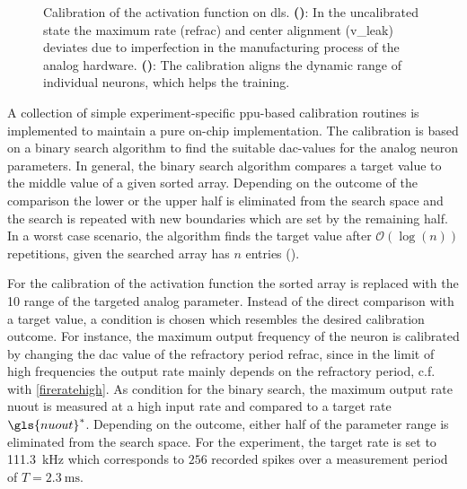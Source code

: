 \begin{figure}
	\centering
	\begin{subfigure}[b]{0.49\textwidth}
		\caption{}
		
		\label{transferfunction_wout_calib}
	\end{subfigure}
	\begin{subfigure}[b]{0.49\textwidth}		
		\caption{}
		
		\label{transferfunction_w_calib}
	\end{subfigure}
	\caption[Calibration of the sigmoid activation function on \acrshort{dls}.]{Calibration of the activation function on \acrshort{dls}. \textbf{()}: In the uncalibrated state the maximum rate (\gls{refrac}) and center alignment (\gls{v_leak}) deviates due to imperfection in the manufacturing process of the analog hardware.  \textbf{()}: The calibration aligns the dynamic range of individual neurons, which helps the training.}
\end{figure}

A collection of simple experiment-specific \gls{ppu}-based calibration routines is implemented to maintain a pure on-chip implementation. The calibration is based on a binary search algorithm to find the suitable \gls{dac}-values for the analog neuron parameters. In general, the binary search algorithm compares a target value to the middle value of a given sorted array. Depending on the outcome of the comparison the lower or the upper half is eliminated from the search space and the search is repeated with new boundaries which are set by the remaining half. In a worst case scenario, the algorithm finds the target value after $\mathcal{O}(\log(n))$ repetitions, given the searched array has $n$ entries  (\citealp{binarysearchsource}).

For the calibration of the activation function the sorted array is replaced with the \SI{10}{\bit} range of the targeted analog parameter. Instead of the direct comparison with a target value, a condition is chosen which resembles the desired calibration outcome. For instance, the maximum output frequency of the neuron is calibrated
by changing the \gls{dac} value of the refractory period \gls{refrac}, since in the limit of high frequencies the output rate mainly depends on the refractory period, c.f. with \cref{fireratehigh}. As condition for the binary search, the maximum output rate \gls{nuout} is measured at a high input rate and compared to a target rate $\gls{nuout}^*$. Depending on the outcome, either half of the parameter range is eliminated from the search space.
For the experiment, the target rate is set to \SI{111.3}{\kilo \Hz} which corresponds to $256$ recorded spikes over a measurement period of $T=\SI{2.3}{\milli \s}$.

